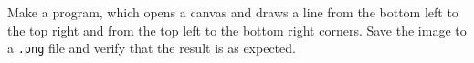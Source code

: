Make a program, which opens a canvas and draws a line from the bottom left to the top right and from the top left to the bottom right corners. Save the image to a \lstinline[language=console]{.png} file and verify that the result is as expected.
